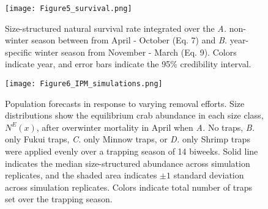 \documentclass{article}
\begin{document}
\begin{figure}[H]
    \centering
    \texttt{[image: Figure5\_survival.png]}
    \caption{Size-structured natural survival rate integrated over the \textit{A.} non-winter season between from April - October (Eq. 7) and \textit{B.} year-specific winter season from November - March (Eq. 9). Colors indicate year, and error bars indicate the 95\% credibility interval.}
\end{figure}

\begin{figure}[H]
    \centering
    \texttt{[image: Figure6\_IPM\_simulations.png]}
    \caption{Population forecasts in response to varying removal efforts. Size distributions show the equilibrium crab abundance in each size class, $N^E(x)$, after overwinter mortality in April when \textit{A.} No traps, \textit{B.} only Fukui traps, \textit{C.} only Minnow traps, or \textit{D.} only Shrimp traps were applied evenly over a trapping season of 14 biweeks. Solid line indicates the median size-structured abundance across simulation replicates, and the shaded area indicates $\pm1$ standard deviation across simulation replicates. Colors indicate total number of traps set over the trapping season.}
\end{figure}


\printbibliography[]
\end{document}
